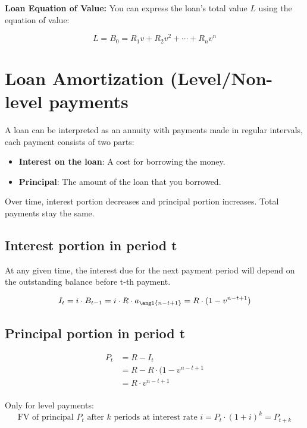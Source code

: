 \textbf{Loan Equation of Value:}
You can express the loan’s total value \( L \) using the equation of value:

\[
L = B_0 = R_1 v + R_2 v^2 + \cdots + R_n v^n
\]

\section{Loan Amortization (Level/Non-level payments}
\begin{comments}
    A loan can be interpreted as an annuity with payments made in regular intervals, each payment consists of two parts:
\begin{itemize}
    \item \textbf{Interest on the loan}: A cost for borrowing the money.
    \item \textbf{Principal}: The amount of the loan that you borrowed.
\end{itemize}

Over time, interest portion decreases and principal portion increases. Total payments stay the same. 
\end{comments}

\subsection{Interest portion in period t}
At any given time, the interest due for the next payment period will depend on the outstanding balance before t-th payment. 

$$I_t = i \cdot B_{t-1} = i \cdot R \cdot a_{\angl{n - t + 1}} =  R \cdot ({1 - v^{n - t + 1}})$$

\subsection{Principal portion in period t}
\begin{align*}
P_t &= R - I_t \\
    &= R - R \cdot (1 - v^{n - t + 1} \\
    &= R \cdot v^{n - t + 1} \\
\end{align*}

\begin{comments}
Only for level payments: 
\[
\text{FV of principal } P_t \text{ after } k \text{ periods at interest rate } i = P_t \cdot (1 + i)^k = P_{t+k}
\]

\end{comments}

